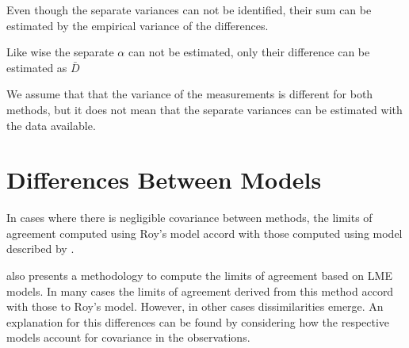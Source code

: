 \documentclass[12pt, a4paper]{report}
\theoremstyle{plain}
\theoremstyle{definition}
\theoremstyle{remark}
\begin{document}



Even though the separate variances can not be identified, their sum can be estimated by the empirical variance of the differences.

Like wise the separate $\alpha$ can not be
estimated, only their difference can be estimated as
$\bar{D}$


We assume that that the variance of the measurements is different for both methods, but it does not mean that the separate variances can be estimated with the data available.
















\section{Differences Between Models}



In cases where there is negligible covariance between methods, the limits of agreement computed using Roy's model accord with those computed using model described by \citet{BXC2008}. 


\citet{BXC2008} also presents a methodology to compute the limits of agreement based on LME models. In many cases the limits of agreement derived from this method accord with those to Roy's model. However, in other cases dissimilarities emerge. An explanation for this differences can be found by considering how the respective models account for covariance in the observations. 
\end{document}
